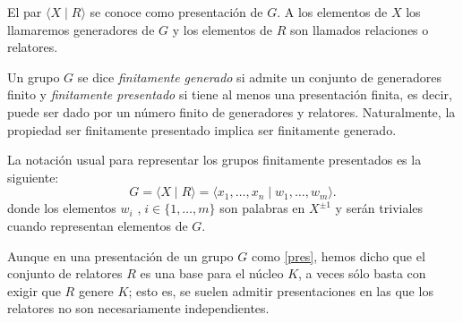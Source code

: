 El par $\langle X \mid R \rangle $ se conoce como presentación de $G$. A los elementos de $X$ los llamaremos generadores de $G$ y los elementos de $R$ son llamados relaciones o relatores.


\begin{definition}
Un grupo $G$ se dice \textit{finitamente generado} si admite un conjunto de generadores finito  y \textit{finitamente presentado} si tiene al menos una presentación finita, es decir, puede ser dado por un número finito de generadores y relatores. Naturalmente, la propiedad ser finitamente presentado implica ser finitamente generado.
\end{definition}

La notación usual para representar los grupos finitamente presentados es la siguiente:
\begin{equation}\label{pres}
    G = \langle X \mid R \rangle  = \langle x_1, \ldots , x_n \mid w_1,  \ldots , w_m  \rangle .
\end{equation}
donde los elementos $w_i$ ,$\; i\in \{1,\ldots, m\}$ son palabras en $X^{\pm 1}$ y serán triviales cuando representan elementos de $G$.




Aunque en una presentación de un grupo $G$ como \eqref{pres}, hemos dicho que el conjunto de relatores $R$ es una base para el núcleo $K$, a veces sólo basta con exigir que $R$ genere $K$; esto es, se suelen admitir presentaciones en las que los relatores no son necesariamente independientes.



